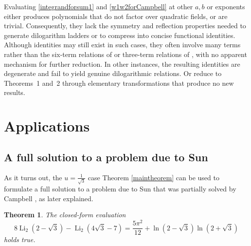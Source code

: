 \documentclass[12pt]{article}
\newtheorem{theorem}{Theorem}
\begin{document}
\remark Evaluating \eqref{integrandforsum1} and \eqref{w1w2forCampbell} at other $a,b$ or exponents either produces 
polynomials that do not factor over quadratic fields, or are trivial. Consequently, they lack the
symmetry and reflection properties needed to generate dilogarithm ladders or to compress
into concise functional identities. Although identities may still exist in such cases,
they often involve many terms rather than the six-term relations of  or three-term relations of , with no
apparent mechanism for further reduction. In other instances, the resulting identities
are degenerate and fail to yield genuine dilogarithmic relations. Or reduce to
Theorems~1 and~2 through elementary transformations that produce no new
results.
\section{Applications} 

\subsection{A full solution to a problem due to Sun}
 As it turns out, the $u = \frac{1}{\sqrt{3}}$ case Theorem \ref{maintheorem} can be used to formulate a full solution to a problem due 
 to Sun \cite{Sun2021,Sun2015} that was partially solved by Campbell \cite{Campbell2023}, as later explained. 

\begin{theorem}\label{theoremSunCampbell}
 The closed-form evaluation
 $$ 8 \operatorname{Li}_2\left(2-\sqrt{3}\right)-\operatorname{Li}_2\left(4 \sqrt{3} - 7 \right) 
 = \frac{5 \pi ^2}{12}+\ln \left(2-\sqrt{3}\right) \ln \left(2+\sqrt{3}\right) $$
 holds true.
\end{theorem}
\end{document}
